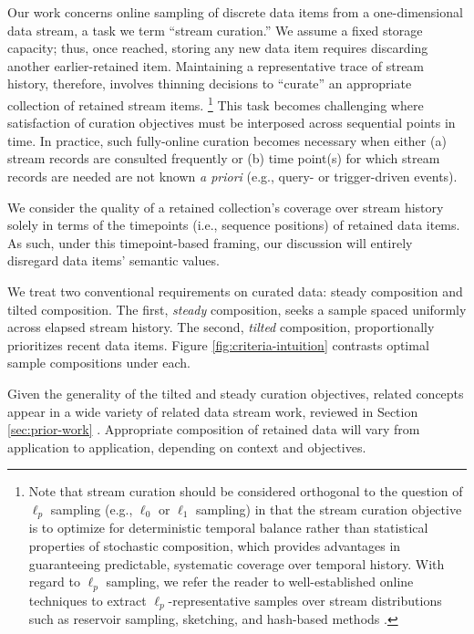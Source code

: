 Our work concerns online sampling of discrete data items from a one-dimensional data stream, a task we term ``stream curation.''
We assume a fixed storage capacity; thus, once reached, storing any new data item requires discarding another earlier-retained item.
Maintaining a representative trace of stream history, therefore, involves thinning decisions to ``curate'' an appropriate collection of retained stream items.%
\footnote{%
Note that stream curation should be considered orthogonal to the question of $\ell_p$ sampling (e.g., $\ell_0$ or $\ell_1$ sampling) in that the stream curation objective is to optimize for deterministic temporal balance rather than statistical properties of stochastic composition, which provides advantages in guaranteeing predictable, systematic coverage over temporal history.
With regard to $\ell_p$ sampling, we refer the reader to well-established online techniques to extract $\ell_p$-representative samples over stream distributions such as reservoir sampling, sketching, and hash-based methods \citep{gaber2005mining,muthukrishnan2005data,cormode2019lp}.
}
This task becomes challenging where satisfaction of curation objectives must be interposed across sequential points in time.
In practice, such fully-online curation becomes necessary when either (a) stream records are consulted frequently or (b) time point(s) for which stream records are needed are not known \textit{a priori} (e.g., query- or trigger-driven events).

We consider the quality of a retained collection's coverage over stream history solely in terms of the timepoints (i.e., sequence positions) of retained data items.
As such, under this timepoint-based framing, our discussion will entirely disregard data items' semantic values.



We treat two conventional requirements on curated data: steady composition and tilted composition.
The first, \textit{{steady}} composition, seeks a sample spaced uniformly across elapsed stream history.
The second, \textit{{tilted}} composition, proportionally prioritizes recent data items.
Figure \ref{fig:criteria-intuition} contrasts optimal sample compositions under each.

Given the generality of the tilted and steady curation objectives, related concepts appear in a wide variety of related data stream work, reviewed in Section \ref{sec:prior-work} \citep{aggarwal2003framework,han2005stream}.
Appropriate composition of retained data will vary from application to application, depending on context and objectives.

